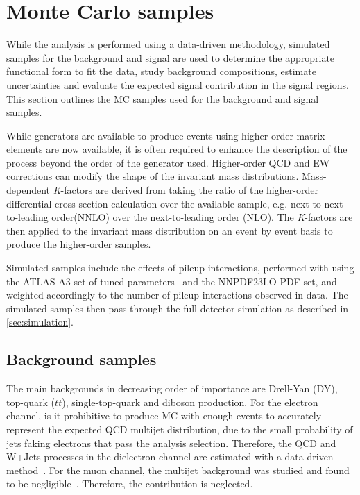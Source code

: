 \clearpage

\section{Monte Carlo samples}\label{sec:datamc:mc}
While the analysis is performed using a data-driven methodology, simulated samples for the background and signal are used to determine the appropriate functional form to fit the data, study background compositions, estimate uncertainties and evaluate the expected signal contribution in the signal regions. This section outlines the MC samples used for the background and signal samples.

While generators are available to produce events using higher-order matrix elements are now available, it is often required to enhance the description of the process beyond the order of the generator used. Higher-order QCD and EW corrections can modify the shape of the invariant mass distributions. Mass-dependent \emph{K}-factors are derived from taking the ratio of the higher-order differential cross-section calculation over the available sample, e.g. next-to-next-to-leading order(NNLO) over the next-to-leading order (NLO). The \emph{K}-factors are then applied to the invariant mass distribution on an event by event basis to produce the higher-order samples. 

Simulated samples include the effects of pileup interactions, performed with  using the ATLAS A3 set of tuned parameters~\cite{ATL-PHYS-PUB-2016-017} and the NNPDF23LO PDF set, and weighted accordingly to the number of pileup interactions observed in data. The simulated samples then pass through the full detector simulation as described in \cref{sec:simulation}. 

\subsection{Background samples}\label{sec:datamc:mc:bkg}
The main backgrounds in decreasing order of importance are Drell-Yan (DY), top-quark ($t\bar{t}$), single-top-quark and diboson production. For the electron channel, is it prohibitive to produce MC with enough events to accurately represent the expected QCD multijet distribution, due to the small probability of jets faking electrons that pass the analysis selection. Therefore, the QCD and W+Jets processes in the dielectron channel are estimated with a data-driven method~\cite{EXOT-2016-05}. For the muon channel, the multijet background was studied and found to be negligible~\cite{EXOT-2016-05}. Therefore, the contribution is neglected. 

